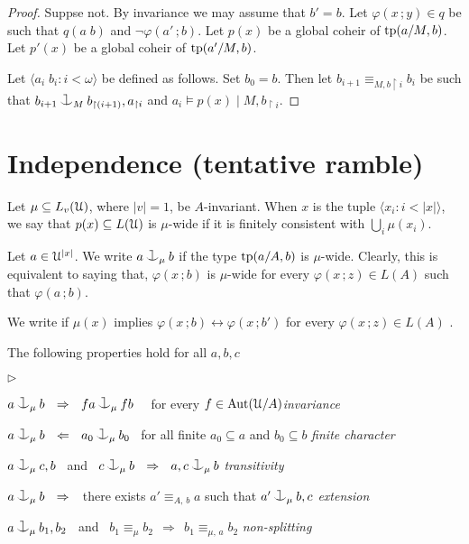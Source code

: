 \documentclass{amsproc}
\newcommand{\mylabel}[1]{{#1}\hfill}
\renewenvironment{itemize}
  {\begin{list}{$\triangleright$}{%
  \setlength{\parskip}{0mm}
  \setlength{\topsep}{.4\baselineskip}
  \setlength{\rightmargin}{0mm}
  \setlength{\listparindent}{0mm}
  \setlength{\itemindent}{0mm}
  \setlength{\labelwidth}{3ex}
  \setlength{\itemsep}{.2\baselineskip}
  \setlength{\parsep}{.2\baselineskip}
  \setlength{\partopsep}{0mm}
  \setlength{\labelsep}{1ex}
  \setlength{\leftmargin}{\labelwidth+\labelsep}
  \let\makelabel\mylabel}}{%
\end{list}}
\renewcommand*{\emph}[1]{%
   \smash{\tikz[baseline]\node[rectangle, fill=teal!25, rounded corners, inner xsep=0.5ex, inner ysep=0.2ex, anchor=base, minimum height = 2.7ex]{\strut #1};}}
\def\cnonfork{\mathbin{\raise1.8ex\rlap{\kern0.6ex\rule{0.6ex}{0.1ex}}\rlap{\kern1.1ex\rule{0.1ex}{1.9ex}}\raise-0.3ex\hbox{$\smile$} } }
\begin{document}
\begin{proof}
  Suppse not. By invariance we may assume that $b'=b$.
  Let $\varphi(x\,;y)\in q$ be such that $q(a\;b)$ and $\neg\varphi(a'\,;b)$.
  Let $p(x)$ be a global coheir of ${\rm tp}(a/M,b)$.
  Let $p'(x)$ be a global coheir of ${\rm tp}(a'/M,b)$.

  Let $\langle a_i\;b_i:i<\omega\rangle$ be defined as follows.
  Set $b_0=b$. 
  Then let $b_{i+1}\equiv_{M,b\restriction i}b_i$ be such that $b_{i+1}\cnonfork_Mb_{\restriction(i+1)},a_{\restriction i}$ and $a_i\models p(x)\mid M,b_{\restriction i}$.
\end{proof}

\section{Independence (tentative ramble)}

Let $\mu\subseteq L_v(\EuScript U)$, where $|v|=1$, be $A$-invariant.
When $x$ is the tuple $\langle x_i:i<|x|\rangle$, we say that $p(x)\subseteq L(\EuScript U)$ is $\mu$-wide if it is finitely consistent with $\bigcup_i\mu(x_i)$.

Let $a\in\EuScript U^{|x|}$.
We write $a\cnonfork_\mu b$ if the type ${\rm tp}(a/A,b)$ is $\mu$-wide. 
Clearly, this is equivalent to saying that,  $\varphi(x\,;b)$ is $\mu$-wide for every $\varphi(x\,;z)\in L(A)$ such that $\varphi(a\,;b)$.

We write\emph{$b\equiv_\mu b'$\/} if $\mu(x)$ implies $\varphi(x\,;b)\leftrightarrow\varphi(x\,;b')$ for every $\varphi(x\,;z)\in L(A)$
.

\begin{lemma}\label{lem_coheir_independence}
  The following properties hold for all $a,b,c$
  \begin{itemize}
  \item[1.] $a\cnonfork_\mu b\ \ \Rightarrow\ \ fa\cnonfork_\mu fb$ \ \ 
            for every $f\in{\rm Aut}(\EuScript U/A)$\hfill \textit{invariance}
  \item[2.] $a\cnonfork_\mu b\ \ \Leftarrow\ \  a_0\cnonfork_\mu b_0$
            \ for all finite $a_0\subseteq a$  and $b_0\subseteq b$ \hfill\textit{finite character}
  \item[3.] $a\cnonfork_\mu c,b$ \ and \ 
            $c\cnonfork_\mu b\ \ \Rightarrow\ \ a,c\cnonfork_\mu b$
            \hfill\hfill\hfill\textit{transitivity}
  \item[4.] $a\cnonfork_\mu b\ \ \Rightarrow\ \ $ 
            there exists $a'\equiv_{A,\,b}a$ such that 
            $a'\cnonfork_\mu b,c$
            \textit{extension}
  \item[5.] $a\cnonfork_\mu b_1,b_2$ \ and \ 
  $b_1\equiv_\mu b_2\ \ \Rightarrow\ \ b_1\equiv_{\mu,\,a}b_2$
            \hspace{\stretch{20}}\textit{non-splitting}
  \end{itemize}
\end{lemma}
\end{document}
